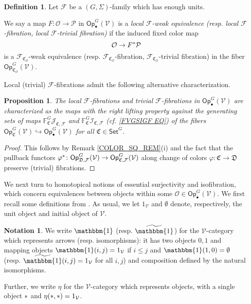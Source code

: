 \documentclass[a4paper,10pt
,draft
]{article}%
\numberwithin{equation}{section}
\numberwithin{figure}{section}
\newtheorem{proposition}[equation]{Proposition}%
\theoremstyle{definition} %
\newtheorem{definition}[equation]{Definition}%
\newtheorem{notation}[equation]{Notation}%
\newcommand{\F}{\ensuremath{\mathcal F}}
\newcommand{\V}{\ensuremath{\mathcal V}}
\renewcommand{\O}{\ensuremath{\mathcal O}}
\renewcommand{\P}{\ensuremath{\mathcal P}}
\newcommand{\1}{\ensuremath{\mathbbm 1}}%
\begin{document}
\begin{definition}
Let $\F$ be a $(G, \Sigma)$-family which has enough units.

We say a map $F: \O \to \P$ in $\mathsf{Op}^G_\bullet(\V)$
is a \emph{local $\F$-weak equivalence (resp. local $\F$-fibration, local $\F$-trivial fibration)}
if the induced fixed color map
\[\O \to F^{\**} \P\]
is a $\F_{\mathfrak{C}_{\O}}$-weak equivalence (resp. $\F_{\mathfrak{C}_{\O}}$-fibration, $\F_{\mathfrak{C}_{\O}}$-trivial fibration) in the fiber $\mathsf{Op}^G_{\mathfrak{C}_{\O}}(\V)$.
\end{definition}


Local (trivial) $\F$-fibrations admit the following alternative characterization.



\begin{proposition}\label{LOCALTCHAR PROP}
The local $\F$-fibrations
and trivial $\F$-fibrations
in $\mathsf{Op}^G_\bullet(\V)$
are characterized as the maps with the right lifting property against the generating sets of maps 
$\mathbb{F}^G_{\mathfrak{C}}\mathcal{J}_{\mathfrak{C},\mathcal{F}}$ and $\mathbb{F}^G_{\mathfrak{C}}\mathcal{I}_{\mathfrak{C},\mathcal{F}}$
(cf. \eqref{FVGSIGF EQ})
of the fibers 
$\mathsf{Op}^G_{\mathfrak{C}}(\V) \hookrightarrow \mathsf{Op}^G_\bullet(\V)$
for all $\mathfrak{C} \in \mathsf{Set}^G$.
\end{proposition}



\begin{proof}
This follows by Remark \ref{COLOR_SQ_REM}(i)
and the fact that the pullback functors
$\varphi^{\**} \colon \mathsf{Op}^G_{\mathfrak{D},\F}(\V)
\to \mathsf{Op}^G_{\mathfrak{C},\F}(\V)$
along change of colors 
$\varphi \colon \mathfrak{C} \to \mathfrak{D}$
preserve (trivial) fibrations.
\end{proof}



We next turn to homotopical notions of essential surjectivity and isofibration, which concern equivalences between objects within some 
$\O \in \mathsf{Op}^G_\bullet(\V)$.
We first recall some definitions from \cite{BM13}.
As usual, we let $1_\V$ and $\emptyset$ denote, respectively, the unit object and initial object of $\V$.

\begin{notation}
      We write $\mathbbm{1}$ (resp. $\widetilde{\mathbbm{1}}$)
      for the $\V$-category which represents arrows (resp. isomorphisms):
      it has two objects $0,1$
      and mapping objects
      $\mathbbm{1}(i,j)= 1_{\V}$
      if $i \leq j$
      and 
      $\mathbbm{1}(1,0)= \emptyset$
      (resp. $\widetilde{\mathbbm{1}}(i,j)= 1_{\V}$ for all $i,j$)
      and composition defined by the natural isomorphisms.

      Further, we write $\eta$ for the $\V$-category which represents objects,
      with a single object $\**$ and $\eta(\**,\**) = 1_\V$.
\end{notation}
\end{document}
